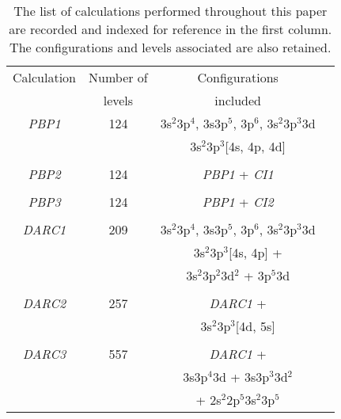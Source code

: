 %
\begin{table}[hbt]
\footnotesize
\begin{center}
\begin{tabular}{@{} l *3c @{}}
\toprule
\multicolumn{1}{c}{Calculation} & Number of & Configurations \\
 & levels & included \\
\toprule
       \multicolumn{1}{c}{\textit{PBP1}} & 124 &  3s$^2$3p$^4$, 3s3p$^5$, 3p$^6$, 3s$^2$3p$^3$3d\\
       \multicolumn{1}{c}{} & & 3s$^2$3p$^3$[4s, 4p, 4d] \\  
                & & \\
              \multicolumn{1}{c}{\textit{PBP2}} & 124 & \textit{PBP1} + \textit{CI1}  \\  
              & & \\
              \multicolumn{1}{c}{\textit{PBP3}} & 124 &  \textit{PBP1} + \textit{CI2} \\  
                & & \\
         \multicolumn{1}{c}{\textit{DARC1}} & 209 & 3s$^2$3p$^4$, 3s3p$^5$, 3p$^6$, 3s$^2$3p$^3$3d\\
           \multicolumn{1}{c}{} &  & 3s$^2$3p$^3$[4s, 4p] +  \\
           \multicolumn{1}{c}{} &  & 3s$^2$3p$^2$3d$^2$ + 3p$^5$3d \\
                     & & \\                        
            \multicolumn{1}{c}{\textit{DARC2}} & 257 &  \textit{DARC1} + \\
             \multicolumn{1}{c}{} & &  3s$^2$3p$^3$[4d, 5s] \\
 & & \\
             \multicolumn{1}{c}{\textit{DARC3}} & 557 &  \textit{DARC1} + \\
             \multicolumn{1}{c}{} & &  3s3p$^4$3d + 3s3p$^3$3d$^2$ \\
                    \multicolumn{1}{c}{} & & + 2s$^2$2p$^5$3s$^2$3p$^5$ \\
             
      \bottomrule
 \end{tabular}
 \caption{The list of calculations performed throughout this paper are recorded and indexed for reference in the first column. The configurations and levels associated are also retained. \label{tab:arg_calculations}}
 \end{center}
\end{table}
%

